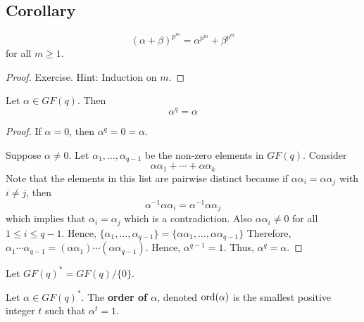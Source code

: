 \begin{thmbox}
    \begin{theorem}
    \subsection{Corollary}
    \[ (\alpha+\beta)^{p^m}=\alpha^{p^m}+\beta^{p^m} \]
    for all $ m\geqslant 1 $.
\end{theorem} \end{thmbox}

\begin{proof}
    Exercise. Hint: Induction on $ m $.
\end{proof}

\begin{thmbox}
    \begin{theorem}
    Let $ \alpha\in GF(q) $. Then
    \[ \alpha^q=\alpha \]
\end{theorem} \end{thmbox}

\begin{proof}
    If $ \alpha=0 $, then $ \alpha^q=0=\alpha $.

    Suppose $ \alpha\neq 0 $. Let $ \alpha_1,\ldots ,\alpha_{q-1} $ be the
    non-zero elements in $ GF(q) $. Consider
    \[ \alpha\alpha_1+\cdots+\alpha\alpha_k \]
    Note that the elements in this list are pairwise distinct because if
    $ \alpha\alpha_i=\alpha\alpha_j $ with $ i\neq j $, then
    \[ \alpha^{-1}\alpha\alpha_i=\alpha^{-1}\alpha\alpha_j \]
    which implies that $ \alpha_i=\alpha_j $ which is a contradiction.
    Also $ \alpha\alpha_i\neq 0 $ for all $ 1\leqslant i\leqslant q-1 $.
    Hence, $ \{\alpha_1,\ldots ,\alpha_{q-1}\}=\{\alpha\alpha_1,\ldots ,\alpha\alpha_{q-1}\} $
    Therefore, $ \alpha_1\cdots\alpha_{q-1}=(\alpha\alpha_1)\cdots(\alpha\alpha_{q-1}) $.
    Hence, $ \alpha^{q-1}=1 $. Thus, $ \alpha^q=\alpha $.
\end{proof}

\begin{defbox}
    \begin{definition}
    Let $ GF(q)^*=GF(q)/\{0\} $.
\end{definition} \end{defbox}

\begin{defbox}
    \begin{definition}
    Let $ \alpha\in GF(q)^* $. The \textbf{order of $\alpha$}, denoted
    $ \operatorname{ord}(\alpha) $ is the smallest positive integer $ t $ such that
    $ \alpha^t=1 $.
\end{definition} \end{defbox}

